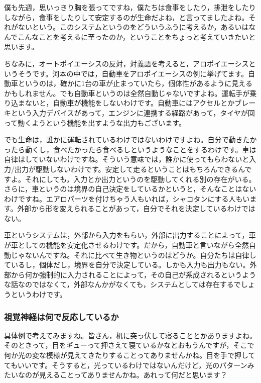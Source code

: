 \documentclass{ltjsbook}
\begin{document}
僕も先週，思いっきり胸を張ってですね，僕たちは食事をしたり，排泄をしたりしながら，食事をしたりして安定するのが生命だよね，と言ってましたよね。それがないという。このシステムというのをどういうふうに考えるか，あるいはなんでこんなことを考えるに至ったのか，ということをちょっと考えていきたいと思います。

ちなみに，オートポイエーシスの反対，対義語を考えると，アロポイエーシスというそうです。河本の中では，自動車をアロポイエーシスの例に挙げてます。自動車というのは，確かに1台の車が止まっていたら，個体性があるように見えるかもしれません。でも自動車というのは全然自動じゃないですよね。運転手が乗り込まないと，自動車が機能をしないわけです。自動車にはアクセルとかブレーキという入力デバイスがあって，エンジンに連携する経路があって，タイヤが回って動くようという機能を出すような出力もございます。

でも生命は，誰かに運転されているわけではないわけですよね。自分で動きたかったら動くし，食べたかったら食べるしというようなことをするわけです。車は自律はしていないわけですね。そういう意味では，誰かに使ってもらわないと入力/出力が駆動しないわけです。安定して走るということはもちろんできるんですよ。それにしても，入力とか出力というのを駆動してくれる別の存在がいる。さらに，車というのは境界の自己決定をしているかというと，そんなことはないわけですね。エアロパーツを付けちゃう人もいれば，シャコタンにする人もいます。外部から形を変えられることがあって，自分でそれを決定しているわけではない。

車というシステムは，外部から入力をもらい，外部に出力することによって，車が車としての機能を安定化させるわけです。だから，自動車と言いながら全然自動じゃないんですね。それに比べて生き物というのはどうか。自分たちは自律しているし，個体だし，境界を自分で決定している。しかも入力も出力もない。外部から何か強制的に入力されることによって，その自己が系成されるというような話なのではなくて，外部なんかがなくても，システムとしては存在するでしょうというわけです。

\subsubsection{視覚神経は何で反応しているか}
具体例で考えてみますね。皆さん，机に突っ伏して寝ることとかありますよね。そのときって，目をギューって押さえて寝ているかなとおもうんですが，そこで何か光の変な模様が見えてきたりすることってありませんかね。目を手で押しててもいいです。そうすると，光っているわけではないんだけど，光のパターンみたいなのが見えることってありませんかね。あれって何だと思います？
\end{document}
